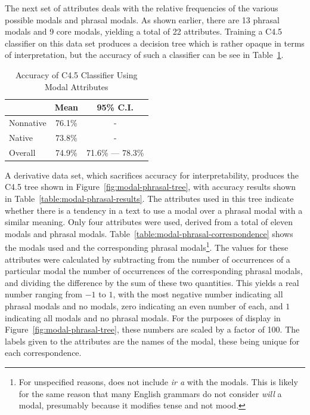 \documentclass[main.tex]{subfiles}
\begin{document}
The next set of attributes deals with the relative frequencies of the various possible modals and phrasal modals. As shown earlier, there are 13 phrasal modals and 9 core modals, yielding a total of 22 attributes. Training a C4.5 classifier on this data set produces a decision tree which is rather opaque in terms of interpretation, but the accuracy of such a classifier can be see in Table~\ref{table:modal-attributes-results}. 
\begin{table}[htbp]
\centering
\caption{Accuracy of C4.5 Classifier Using Modal Attributes}
\begin{tabular}{l c c}
\toprule
& Mean & 95\% C.I.\\
\midrule
Nonnative & 76.1\% & - \\
Native & 73.8\% & - \\
Overall & 74.9\% & 71.6\% --- 78.3\% \\
\bottomrule
\end{tabular}
\label{table:modal-attributes-results}
\end{table}
A derivative data set, which sacrifices accuracy for interpretability, produces the C4.5 tree shown in Figure~\ref{fig:modal-phrasal-tree}, with accuracy results shown in Table~\ref{table:modal-phrasal-results}. The attributes used in this tree indicate whether there is a tendency in a text to use a modal over a phrasal modal with a similar meaning. Only four attributes were used, derived from a total of eleven modals and phrasal modals. Table~\ref{table:modal-phrasal-correspondence} shows the modals used and the corresponding phrasal modals\footnote{For unspecified reasons, \citet{butt} does not include \textit{ir a} with the modals. This is likely for the same reason that many English grammars do not consider \textit{will} a modal, presumably because it modifies tense and not mood.}. The values for these attributes were calculated by subtracting from the number of occurrences of a particular modal the number of occurrences of the corresponding phrasal modals, and dividing the difference by the sum of these two quantities. This yields a real number ranging from $-1$ to $1$, with the most negative number indicating all phrasal modals and no modals, zero indicating an even number of each, and $1$ indicating all modals and no phrasal modals. For the purposes of display in Figure~\ref{fig:modal-phrasal-tree}, these numbers are scaled by a factor of 100. The labels given to the attributes are the names of the modal, these being unique for each correspondence.
\end{document}
